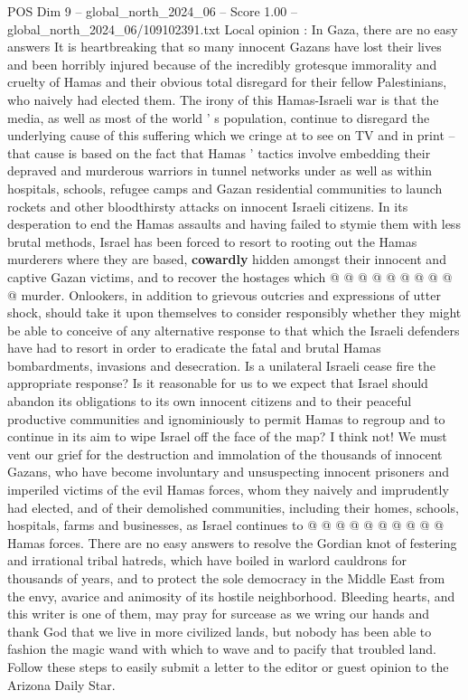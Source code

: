 \begin{textsample}{POS Dim 9 – global\_north\_2024\_06 – Score 1.00 – global\_north\_2024\_06/109102391.txt}  \label{ex:f9_pos_288}
Local opinion : In Gaza, there are no easy answers It is heartbreaking that so many innocent Gazans have lost their lives and been horribly injured because of the incredibly grotesque immorality and cruelty of Hamas and their obvious total disregard for their fellow Palestinians, who naively had elected them.
The irony of this Hamas-Israeli war is that the media, as well as most of the world ' s population, continue to disregard the underlying cause of this suffering which we cringe at to see on TV and in print -- that cause is based on the fact that Hamas ' tactics involve embedding their depraved and murderous warriors in tunnel networks under as well as within hospitals, schools, refugee camps and Gazan residential communities to launch rockets and other bloodthirsty attacks on innocent Israeli citizens.
In its desperation to end the Hamas assaults and having failed to stymie them with less brutal methods, Israel has been forced to resort to rooting out the Hamas murderers where they are based, \textbf{cowardly} hidden amongst their innocent and captive Gazan victims, and to recover the hostages which @ @ @ @ @ @ @ @ @ @ murder.
Onlookers, in addition to grievous outcries and expressions of utter shock, should take it upon themselves to consider responsibly whether they might be able to conceive of any alternative response to that which the Israeli defenders have had to resort in order to eradicate the fatal and brutal Hamas bombardments, invasions and desecration.
Is a unilateral Israeli cease fire the appropriate response?
Is it reasonable for us to we expect that Israel should abandon its obligations to its own innocent citizens and to their peaceful productive communities and ignominiously to permit Hamas to regroup and to continue in its aim to wipe Israel off the face of the map?
I think not!
We must vent our grief for the destruction and immolation of the thousands of innocent Gazans, who have become involuntary and unsuspecting innocent prisoners and imperiled victims of the evil Hamas forces, whom they naively and imprudently had elected, and of their demolished communities, including their homes, schools, hospitals, farms and businesses, as Israel continues to @ @ @ @ @ @ @ @ @ @ Hamas forces.
There are no easy answers to resolve the Gordian knot of festering and irrational tribal hatreds, which have boiled in warlord cauldrons for thousands of years, and to protect the sole democracy in the Middle East from the envy, avarice and animosity of its hostile neighborhood.
Bleeding hearts, and this writer is one of them, may pray for surcease as we wring our hands and thank God that we live in more civilized lands, but nobody has been able to fashion the magic wand with which to wave and to pacify that troubled land.
Follow these steps to easily submit a letter to the editor or guest opinion to the Arizona Daily Star.

\end{textsample}
